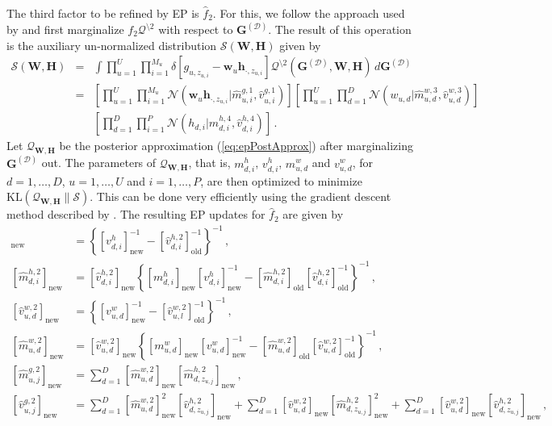 The third factor to be refined by EP is $\hat{f}_2$. For this, we follow the approach used by \cite{stern2009}
and first marginalize $f_2\mathcal{Q}^{\setminus 2}$ with respect to $\mathbf{G}^{(\mathcal{D})}$.
The result of this operation is the auxiliary un-normalized distribution $\mathcal{S}(\mathbf{W},\mathbf{H})$ given by
\begin{eqnarray}
\mathcal{S}(\mathbf{W},\mathbf{H}) & = & \int 
\prod_{u=1}^{U} \prod_{i=1}^{M_u}\delta[g_{u,z_{u,i}}-\mathbf{w}_u\mathbf{h}_{\cdot,z_{u,i}}]
\mathcal{Q}^{\setminus 2 }(\mathbf{G}^{(\mathcal{D})},\mathbf{W},\mathbf{H})\,d\mathbf{G}^{(\mathcal{D})}\nonumber\\
& = & \left[\prod_{u=1}^{U}
\prod_{i=1}^{M_u}\mathcal{N}(\mathbf{w}_u\mathbf{h}_{\cdot,z_{u,i}}|\hat{m}^{g,1}_{u,i},\hat{v}^{g,1}_{u,i})\right]
\left[ \prod_{u=1}^U\prod_{d=1}^D \mathcal{N}(w_{u,d}|\hat{m}^{w,3}_{u,d},\hat{v}^{w,3}_{u,d}) \right]\nonumber \\
& & \left[ \prod_{d=1}^D\prod_{i=1}^P \mathcal{N}(h_{d,i}|\hat{m}^{h,4}_{d,i},\hat{v}^{h,4}_{d,i}) \right]\,.
\end{eqnarray}
Let $\mathcal{Q}_{\mathbf{W},\mathbf{H}}$ be the posterior approximation (\ref{eq:epPostApprox}) after marginalizing $\mathbf{G}^{(\mathcal{D})}$ out.
The parameters of $\mathcal{Q}_{\mathbf{W},\mathbf{H}}$, that is, $m_{d,i}^{h}$,
$v_{d,i}^{h}$, $m_{u,d}^{w}$ and $v_{u,d}^{w}$, for $d = 1,\ldots,D$, $u=1,\ldots,U$ and $i = 1,\ldots,P$,
are then optimized to minimize $\text{KL}(\mathcal{Q}_{\mathbf{W},\mathbf{H}}\|\mathcal{S})$.
This can be done very efficiently using the gradient descent method described by \cite{raiko2007}. The resulting EP updates for $\hat{f}_2$ are
given by
\begin{align}
[\hat{v}_{d,i}^{h,2}]_\text{new} & =
\left\{ [v_{d,i}^{h}]_\text{new}^{-1} - [\hat{v}_{d,i}^{h,2} ]_\text{old}^{-1}\right\}^{-1}\,,\\
[\hat{m}_{d,i}^{h,2}]_\text{new} & =
[\hat{v}_{d,i}^{h,2}]_\text{new} \left\{[ m_{d,i}^{h}]_\text{new} 
[v_{d,i}^{h}]_\text{new}^{-1} - [\hat{m}_{d,i}^{h,2}]_\text{old} [\hat{v}_{d,i}^{h,2}]_\text{old}^{-1}\right\}^{-1}\,,\\
[\hat{v}_{u,d}^{w,2}]_\text{new} & =
\left\{ [v_{u,d}^{w}]_\text{new}^{-1} - [\hat{v}_{u,l}^{w,2} ]_\text{old}^{-1}\right\}^{-1}\,,\\
[\hat{m}_{u,d}^{w,2}]_\text{new} & =
[\hat{v}_{u,d}^{w,2}]_\text{new} \left\{[ m_{u,d}^{w}]_\text{new} 
[v_{u,d}^{w}]_\text{new}^{-1} - [\hat{m}_{u,d}^{w,2}]_\text{old} [\hat{v}_{u,d}^{w,2}]_\text{old}^{-1}\right\}^{-1}\,,\\
[\hat{m}_{u,j}^{g,2}]_\text{new} & = \sum_{d=1}^D [\hat{m}_{u,d}^{w,2}]_\text{new} [\hat{m}_{d,z_{u,j}}^{h,2}]_\text{new}\,,\\
[\hat{v}_{u,j}^{g,2}]_\text{new} & = \sum_{d=1}^D [\hat{m}_{u,d}^{w,2}]_\text{new}^2 [\hat{v}_{d,z_{u,j}}^{h,2}]_\text{new} +
\sum_{d=1}^D [\hat{v}_{u,d}^{w,2}]_\text{new} [\hat{m}_{d,z_{u,j}}^{h,2}]_\text{new}^2 +
\sum_{d=1}^D [\hat{v}_{u,d}^{w,2}]_\text{new} [\hat{v}_{d,z_{u,j}}^{h,2}]_\text{new}\,,
\end{align}
